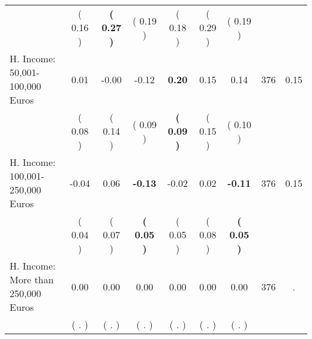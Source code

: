 \begin{tabular}{lcccccccc}
 & (     0.16 ) & \textbf{(     0.27 )} & (     0.19 ) & (     0.18 ) & (     0.29 ) & (     0.19 ) & \\
H. Income: 50,001-100,000 Euros &      0.01 &     -0.00 &     -0.12 & \textbf{     0.20} &      0.15 &      0.14 & 376 &       0.15 \\ 
 & (     0.08 ) & (     0.14 ) & (     0.09 ) & \textbf{(     0.09 )} & (     0.15 ) & (     0.10 ) & \\
H. Income: 100,001-250,000 Euros &     -0.04 &      0.06 & \textbf{    -0.13} &     -0.02 &      0.02 & \textbf{    -0.11} & 376 &       0.15 \\ 
 & (     0.04 ) & (     0.07 ) & \textbf{(     0.05 )} & (     0.05 ) & (     0.08 ) & \textbf{(     0.05 )} & \\
H. Income: More than 250,000 Euros &      0.00 &      0.00 &      0.00 &      0.00 &      0.00 &      0.00 & 376 &          . \\ 
 & (        . ) & (        . ) & (        . ) & (        . ) & (        . ) & (        . ) & \\
\bottomrule
\end{tabular}
